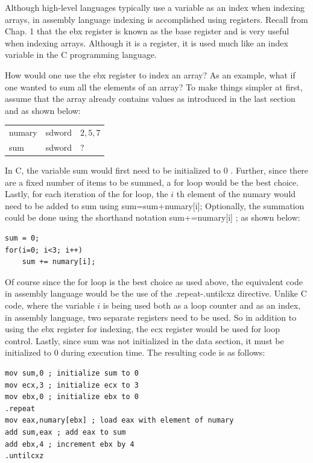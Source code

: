 \documentclass[10pt]{article}
\begin{document}
Although high-level languages typically use a variable as an index when indexing arrays, in assembly language indexing is accomplished using registers. Recall from Chap. 1 that the ebx register is known as the base register and is very useful when indexing arrays. Although it is a register, it is used much like an index variable in the C programming language.

How would one use the ebx register to index an array? As an example, what if one wanted to sum all the elements of an array? To make things simpler at first, assume that the array already contains values as introduced in the last section and as shown below:

\begin{center}
\begin{tabular}{lll}
numary & sdword & $2,5,7$ \\
sum & sdword & $?$ \\
\end{tabular}
\end{center}

In C, the variable sum would first need to be initialized to 0 . Further, since there are a fixed number of items to be summed, a for loop would be the best choice. Lastly, for each iteration of the for loop, the $i$ th element of the numary would need to be added to sum using sum=sum+numary[i]; Optionally, the summation could be done using the shorthand notation sum+=numary[i] ; as shown below:

\begin{verbatim}
sum = 0;
for(i=0; i<3; i++)
    sum += numary[i];
\end{verbatim}

Of course since the for loop is the best choice as used above, the equivalent code in assembly language would be the use of the .repeat-.untilcxz directive. Unlike C code, where the variable $i$ is being used both as a loop counter and as an index, in assembly language, two separate registers need to be used. So in addition to using the ebx register for indexing, the ecx register would be used for loop control. Lastly, since sum was not initialized in the data section, it must be initialized to 0 during execution time. The resulting code is as follows:

\begin{verbatim}
mov sum,0 ; initialize sum to 0
mov ecx,3 ; initialize ecx to 3
mov ebx,0 ; initialize ebx to 0
.repeat
mov eax,numary[ebx] ; load eax with element of numary
add sum,eax ; add eax to sum
add ebx,4 ; increment ebx by 4
.untilcxz
\end{verbatim}
\end{document}
